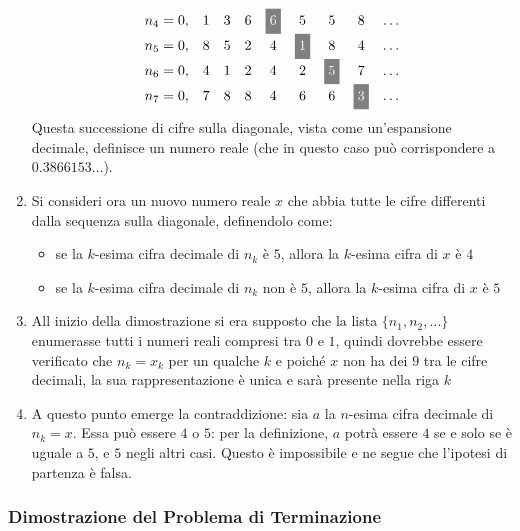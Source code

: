 \documentclass[italian, 10pt]{article}
\begin{document}
\begin{enumerate}
\[\begin{matrix}
            n_4 = 0, & 1               & 3               & 6               & \whiteongray{6} & 5               & 5               & 8               & \ldots \\
            n_5 = 0, & 8               & 5               & 2               & 4               & \whiteongray{1} & 8               & 4               & \ldots \\
            n_6 = 0, & 4               & 1               & 2               & 4               & 2               & \whiteongray{5} & 7               & \ldots \\
            n_7 = 0, & 7               & 8               & 8               & 4               & 6               & 6               & \whiteongray{3} & \ldots \\
          \end{matrix}\]
        Questa successione di cifre sulla diagonale, vista come un'espansione decimale, definisce un numero reale (che in questo caso può corrispondere a \(0.3866153 \ldots\)).
  \item Si consideri ora un nuovo numero reale \(x\) che abbia tutte le cifre differenti dalla sequenza sulla diagonale, definendolo come:
        \begin{itemize}
          \item se la \(k\)-esima cifra decimale di \(n_k\) è \(5\), allora la \(k\)-esima cifra di \(x\) è \(4\)
          \item se la \(k\)-esima cifra decimale di \(n_k\) non è \(5\), allora la \(k\)-esima cifra di \(x\) è \(5\)
        \end{itemize}
  \item All inizio della dimostrazione si era supposto che la lista \(\{n_1, n_2, \ldots\}\) enumerasse tutti i numeri reali compresi tra \(0\) e \(1\), quindi dovrebbe essere verificato che \(n_k = x_k\) per un qualche \(k\) e poiché \(x\) non ha dei \(9\) tra le cifre decimali, la sua rappresentazione è unica e sarà presente nella riga \(k\)
  \item A questo punto emerge la contraddizione: sia \(a\) la \(n\)-esima cifra decimale di \(n_k = x\). Essa può essere \(4\) o \(5\): per la definizione, \(a\) potrà essere \(4\) se e solo se è uguale a \(5\), e \(5\) negli altri casi. Questo è impossibile e ne segue che l'ipotesi di partenza è falsa.
\end{enumerate}

\subsubsection{Dimostrazione del Problema di Terminazione}
\label{sec:dimostrazione-problema-terminazione}
\end{document}
